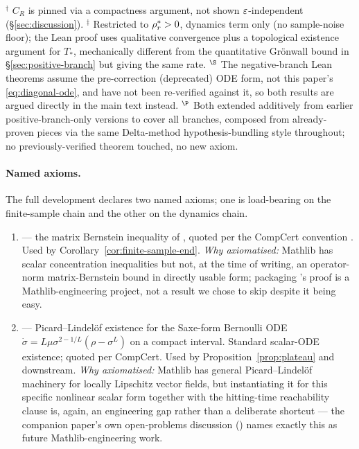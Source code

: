 {\small\noindent
$^\dagger$ $C_R$ is pinned via a compactness argument, not shown $\varepsilon$-independent
(\S\ref{sec:discussion}).\quad
$^\ddagger$ Restricted to $\rho_r^*>0$, dynamics term only (no sample-noise floor); the
Lean proof uses qualitative convergence plus a topological existence argument for $T_*$,
mechanically different from the quantitative Gr\"onwall bound in \S\ref{sec:positive-branch}
but giving the same rate.\quad
$^\S$ The negative-branch Lean theorems assume the pre-correction (deprecated) ODE form,
not this paper's \eqref{eq:diagonal-ode}, and have not been re-verified against it, so
both results are argued directly in the main text instead.\quad
$^\P$ Both extended additively from earlier positive-branch-only versions to cover all
branches, composed from already-proven pieces via the same Delta-method hypothesis-bundling
style throughout; no previously-verified theorem touched, no new axiom.
\par}

\paragraph{Named axioms.}
The full development declares two named axioms; one is load-bearing on
the finite-sample chain and the other on the dynamics chain.

\begin{enumerate}[label=\textbf{(A\arabic*)},leftmargin=2.5em,itemsep=2pt]
\item[\textbf{(A1)}] 
--- the matrix Bernstein inequality of \citet[Thm 1.6.2]{Tropp2015},
quoted per the CompCert convention \citep{Leroy2009}.
Used by Corollary~\ref{cor:finite-sample-end}. \emph{Why axiomatised:}
Mathlib has scalar concentration inequalities but not, at the time of
writing, an operator-norm matrix-Bernstein bound in directly usable
form; packaging \citet{Tropp2015}'s proof is a Mathlib-engineering
project, not a result we chose to skip despite it being easy.
\item[\textbf{(A2)}] 
--- Picard--Lindel\"of existence for the Saxe-form Bernoulli ODE
$\dot\sigma = L\mu\sigma^{2-1/L}(\rho - \sigma^L)$ on a compact
interval. Standard scalar-ODE existence; quoted per CompCert.
Used by Proposition~\ref{prop:plateau} and downstream. \emph{Why
axiomatised:} Mathlib has general Picard--Lindel\"of machinery for
locally Lipschitz vector fields, but instantiating it for this specific
nonlinear scalar form together with the hitting-time reachability
clause is, again, an engineering gap rather than a deliberate shortcut
--- the companion paper's own open-problems discussion
(\citealt[\S{}Open problems]{Goh2026ordering}) names exactly this as
future Mathlib-engineering work.
\end{enumerate}
